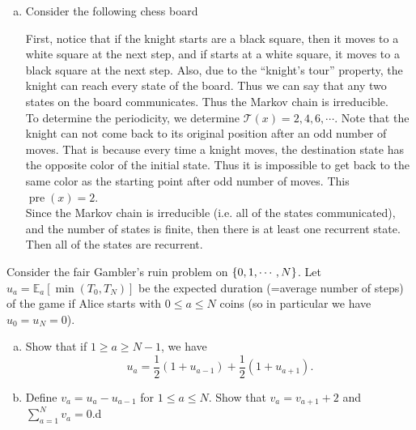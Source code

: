 \begin{solution}
\begin{enumerate}[(a)]
		\item Consider the following chess board
		\begin{center}
			\newgame
			\scalebox{0.7}{
				\chessboard[
				setfen=8/8/8/4N3/8/8/8/8 w - - 0 0, %
				pgfstyle=border,
				markfields={e5,d7,f7,g6,g4,f3,d3,c4,c6}, %
				color=blue!50,
				pgfstyle=color,
				opacity=0.1,
				color=red,
				markfield={e5} %
				]}
		\end{center}
		First, notice that if the knight starts are a black square, then it moves to a white square at the next step, and if starts at a white square, it moves to a black square at the next step. Also, due to the ``knight's tour'' property, the knight can reach every state of the board. Thus we can say that any two states on the board communicates. Thus the Markov chain is irreducible. \\
		To determine the periodicity, we determine $\mathcal{T}(x) = {2,4,6,\cdots}$. Note that the knight can not come back to its original position after an odd number of moves. That is because every time a knight moves, the destination state has the opposite color of the initial state. Thus it is impossible to get back to the same color as the starting point after odd number of moves. This $\operatorname{pre}(x) =2$.\\
		Since the Markov chain is irreducible (i.e. all of the states communicated), and the number of states is finite, then there is at least one recurrent state. Then all of the states are recurrent.
	\end{enumerate}
\end{solution}



\begin{problem}
	Consider the fair Gambler's ruin problem on $\{0,1,\cdots,N\}$.  Let $u_a = \mathbb{E}_a[\min(T_0,T_N)]$ be the expected duration (=average number of steps) of the game if Alice starts with $0\leq a \leq N$ coins (so in particular we have $u_0 = u_N = 0$).
	\begin{enumerate}[(a)]
		\item Show that if $1\geq a \geq N-1$, we have
		\[ u_a = \frac{1}{2}(1+u_{a-1}) + \frac{1}{2}(1+u_{a+1}). \]
		\item Define $v_a = u_a - u_{a-1}$ for $1 \leq a \leq N$. Show that $v_a = v_{a+1} + 2$ and $\sum_{a=1}^{N} v_a =0$.d
	\end{enumerate}
\end{problem}

